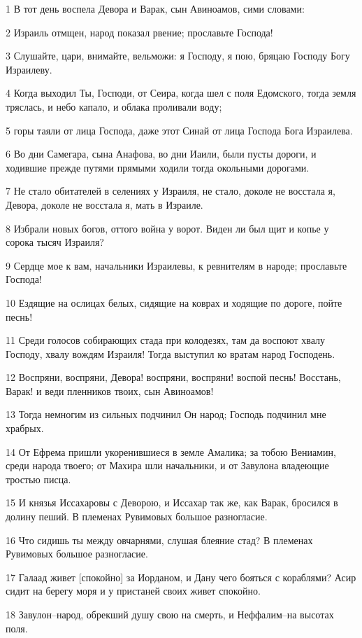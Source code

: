 \par 1 В тот день воспела Девора и Варак, сын Авиноамов, сими словами:
\par 2 Израиль отмщен, народ показал рвение; прославьте Господа!
\par 3 Слушайте, цари, внимайте, вельможи: я Господу, я пою, бряцаю Господу Богу Израилеву.
\par 4 Когда выходил Ты, Господи, от Сеира, когда шел с поля Едомского, тогда земля тряслась, и небо капало, и облака проливали воду;
\par 5 горы таяли от лица Господа, даже этот Синай от лица Господа Бога Израилева.
\par 6 Во дни Самегара, сына Анафова, во дни Иаили, были пусты дороги, и ходившие прежде путями прямыми ходили тогда окольными дорогами.
\par 7 Не стало обитателей в селениях у Израиля, не стало, доколе не восстала я, Девора, доколе не восстала я, мать в Израиле.
\par 8 Избрали новых богов, оттого война у ворот. Виден ли был щит и копье у сорока тысяч Израиля?
\par 9 Сердце мое к вам, начальники Израилевы, к ревнителям в народе; прославьте Господа!
\par 10 Ездящие на ослицах белых, сидящие на коврах и ходящие по дороге, пойте песнь!
\par 11 Среди голосов собирающих стада при колодезях, там да воспоют хвалу Господу, хвалу вождям Израиля! Тогда выступил ко вратам народ Господень.
\par 12 Воспряни, воспряни, Девора! воспряни, воспряни! воспой песнь! Восстань, Варак! и веди пленников твоих, сын Авиноамов!
\par 13 Тогда немногим из сильных подчинил Он народ; Господь подчинил мне храбрых.
\par 14 От Ефрема пришли укоренившиеся в земле Амалика; за тобою Вениамин, среди народа твоего; от Махира шли начальники, и от Завулона владеющие тростью писца.
\par 15 И князья Иссахаровы с Деворою, и Иссахар так же, как Варак, бросился в долину пеший. В племенах Рувимовых большое разногласие.
\par 16 Что сидишь ты между овчарнями, слушая блеяние стад? В племенах Рувимовых большое разногласие.
\par 17 Галаад живет [спокойно] за Иорданом, и Дану чего бояться с кораблями? Асир сидит на берегу моря и у пристаней своих живет спокойно.
\par 18 Завулон--народ, обрекший душу свою на смерть, и Неффалим--на высотах поля.
